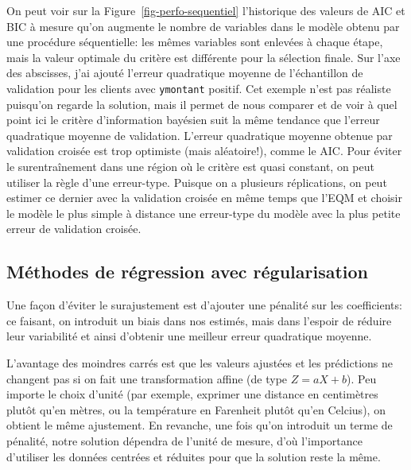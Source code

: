 \documentclass[
  11pt,
  letterpaper,
]{book}
\theoremstyle{definition}
\theoremstyle{remark}
\begin{document}
On peut voir sur la Figure~\ref{fig-perfo-sequentiel} l'historique des
valeurs de AIC et BIC à mesure qu'on augmente le nombre de variables
dans le modèle obtenu par une procédure séquentielle: les mêmes
variables sont enlevées à chaque étape, mais la valeur optimale du
critère est différente pour la sélection finale. Sur l'axe des
abscisses, j'ai ajouté l'erreur quadratique moyenne de l'échantillon de
validation pour les clients avec \texttt{ymontant} positif. Cet exemple
n'est pas réaliste puisqu'on regarde la solution, mais il permet de nous
comparer et de voir à quel point ici le critère d'information bayésien
suit la même tendance que l'erreur quadratique moyenne de validation.
L'erreur quadratique moyenne obtenue par validation croisée est trop
optimiste (mais aléatoire!), comme le AIC. Pour éviter le
surentraînement dans une région où le critère est quasi constant, on
peut utiliser la règle d'une erreur-type. Puisque on a plusieurs
réplications, on peut estimer ce dernier avec la validation croisée en
même temps que l'EQM et choisir le modèle le plus simple à distance une
erreur-type du modèle avec la plus petite erreur de validation croisée.

\hypertarget{muxe9thodes-de-ruxe9gression-avec-ruxe9gularisation}{%
\subsection{Méthodes de régression avec
régularisation}\label{muxe9thodes-de-ruxe9gression-avec-ruxe9gularisation}}

Une façon d'éviter le surajustement est d'ajouter une pénalité sur les
coefficients: ce faisant, on introduit un biais dans nos estimés, mais
dans l'espoir de réduire leur variabilité et ainsi d'obtenir une
meilleur erreur quadratique moyenne.

L'avantage des moindres carrés est que les valeurs ajustées et les
prédictions ne changent pas si on fait une transformation affine (de
type \(Z = aX+b\)). Peu importe le choix d'unité (par exemple, exprimer
une distance en centimètres plutôt qu'en mètres, ou la température en
Farenheit plutôt qu'en Celcius), on obtient le même ajustement. En
revanche, une fois qu'on introduit un terme de pénalité, notre solution
dépendra de l'unité de mesure, d'où l'importance d'utiliser les données
centrées et réduites pour que la solution reste la même.
\end{document}
